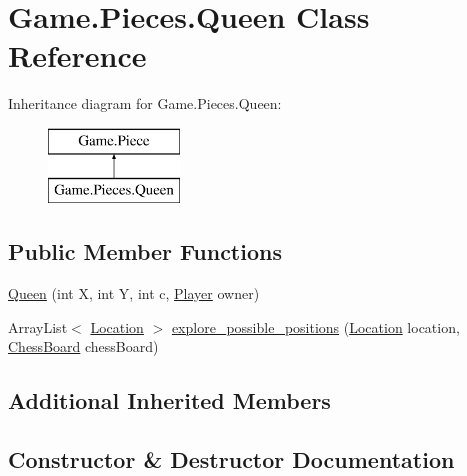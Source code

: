 \hypertarget{class_game_1_1_pieces_1_1_queen}{}\section{Game.\+Pieces.\+Queen Class Reference}
\label{class_game_1_1_pieces_1_1_queen}
Inheritance diagram for Game.\+Pieces.\+Queen\+:\begin{figure}[H]
\begin{center}
\leavevmode
\includegraphics[height=2.000000cm]{class_game_1_1_pieces_1_1_queen}
\end{center}
\end{figure}
\subsection*{Public Member Functions}
\begin{DoxyCompactItemize}
\item 
\hyperlink{class_game_1_1_pieces_1_1_queen_af381f57ec9bc379e0da9d3caec0d5100}{Queen} (int X, int Y, int c, \hyperlink{class_game_1_1_player}{Player} owner)
\item 
Array\+List$<$ \hyperlink{class_game_1_1_location}{Location} $>$ \hyperlink{class_game_1_1_pieces_1_1_queen_a316c438998d9f78f313ebc4d02f5166f}{explore\+\_\+possible\+\_\+positions} (\hyperlink{class_game_1_1_location}{Location} location, \hyperlink{class_game_1_1_chess_board}{Chess\+Board} chess\+Board)
\end{DoxyCompactItemize}
\subsection*{Additional Inherited Members}


\subsection{Constructor \& Destructor Documentation}
\mbox{\label{class_game_1_1_pieces_1_1_queen_af381f57ec9bc379e0da9d3caec0d5100}} 
